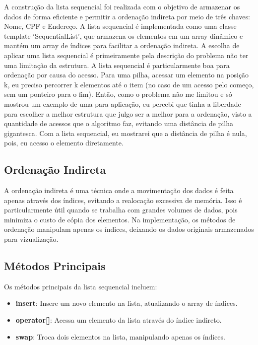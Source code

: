 \documentclass[a4paper,12pt]{article}
\begin{document}
A construção da lista sequencial foi realizada com o objetivo de armazenar os dados de forma eficiente e permitir a ordenação indireta por meio de três chaves: 
Nome, CPF e Endereço. A lista sequencial é implementada como uma classe template `SequentialList', que armazena os elementos em um array dinâmico e mantém um array de índices para facilitar a ordenação indireta.
A escolha de aplicar uma lista sequencial é primeiramente pela descrição do problema não ter uma limitação da estrutura. A lista sequencial é particularmente boa para ordenação por causa do acesso.
Para uma pilha, acessar um elemento na posição k, eu preciso percorrer k elementos até o item (no caso de um acesso pelo começo, sem um ponteiro para o fim). Então, como o problema não me limitou e só 
mostrou um exemplo de uma para aplicação, eu percebi que tinha a liberdade para escolher a melhor estrutura que julgo ser a melhor para a ordenação, visto a quantidade de acessos que o algoritmo faz, 
evitando uma distância de pilha gigantesca. Com a lista sequencial, eu mostrarei que a distância de pilha é nula, pois, eu acesso o elemento diretamente.

\subsection{Ordenação Indireta}
\hspace*{1cm}

A ordenação indireta é uma técnica onde a movimentação dos dados é feita apenas através dos índices, evitando a realocação excessiva de memória. 
Isso é particularmente útil quando se trabalha com grandes volumes de dados, pois minimiza o custo de cópia dos elementos. Na implementação, 
os métodos de ordenação manipulam apenas os índices, deixando os dados originais armazenados para vizualização.

\subsection{Métodos Principais}
\hspace*{1cm}

Os métodos principais da lista sequencial incluem:
\begin{itemize}
    \item \textbf{insert}: Insere um novo elemento na lista, atualizando o array de índices.
    \item \textbf{operator[]}: Acessa um elemento da lista através do índice indireto.
    \item \textbf{swap}: Troca dois elementos na lista, manipulando apenas os índices.
\end{itemize}
\end{document}
